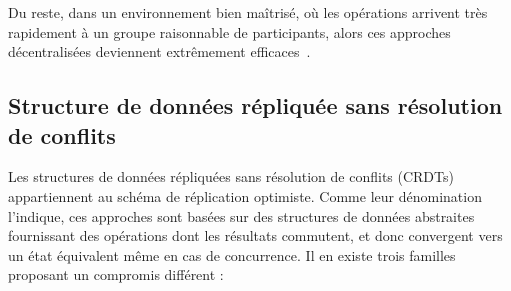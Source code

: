 \noindent Du reste, dans un environnement bien maîtrisé, où les opérations
arrivent très rapidement à un groupe raisonnable de participants, alors ces
approches décentralisées deviennent extrêmement
efficaces~\cite{mehdi2014merging}.




\subsection{Structure de données répliquée sans résolution de conflits}
\label{repl:subsec:crdts}


Les structures de données répliquées sans résolution de conflits
(CRDTs)~\cite{shapiro2011comprehensive, shapiro2011conflict} appartiennent au
schéma de réplication optimiste. Comme leur dénomination l'indique, ces
approches sont basées sur des structures de données abstraites fournissant des
opérations dont les résultats commutent, et donc convergent vers un état
équivalent même en cas de concurrence.  Il en existe trois familles proposant un
compromis différent :

